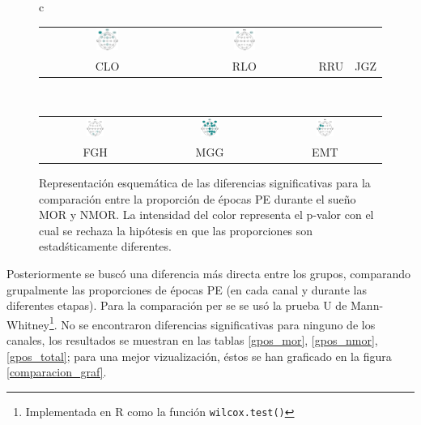 \documentclass[12pt,a4paper]{mitthesis}
\begin{document}
\begin{figure}
\begin{tabular}{c}
\begin{tabular}{cccc}
\includegraphics[width=0.17\textwidth]{./cabecitas/cabecita_RRU.pdf} &
\includegraphics[width=0.17\textwidth]{./cabecitas/cabecita_JGZ.pdf} \\
CLO & RLO & RRU & JGZ
\end{tabular}
\\
\begin{tabular}{ccc}
\includegraphics[width=0.17\textwidth]{./cabecitas/cabecita_FGH.pdf} &
\includegraphics[width=0.17\textwidth]{./cabecitas/cabecita_MGG.pdf} &
\includegraphics[width=0.17\textwidth]{./cabecitas/cabecita_EMT.pdf} \\
FGH & MGG & EMT
\end{tabular}
\end{tabular}
\caption{Representaci\'on esquem\'atica de las
diferencias significativas para la comparaci\'on entre la proporci\'on de \'epocas PE durante el
sue\~no MOR y NMOR.
La intensidad del color representa el p-valor con el cual se rechaza la hip\'otesis en que las 
proporciones son estad\'sticamente diferentes.}
\label{cabecitas_munchas}
\end{figure}

Posteriormente se busc\'o una diferencia m\'as directa entre los grupos, comparando grupalmente las 
proporciones de \'epocas PE (en cada canal y durante las diferentes etapas). Para la comparaci\'on 
per se se us\'o la prueba U de Mann-Whitney\footnote{Implementada en R como la funci\'on 
\texttt{wilcox.test()}}.
No se encontraron diferencias significativas para ninguno de los canales, los resultados se 
muestran en las tablas \ref{gpos_mor}, \ref{gpos_nmor}, \ref{gpos_total}; para una mejor 
vizualizaci\'on, \'estos se han graficado en la figura \ref{comparacion_graf}.
\end{document}
